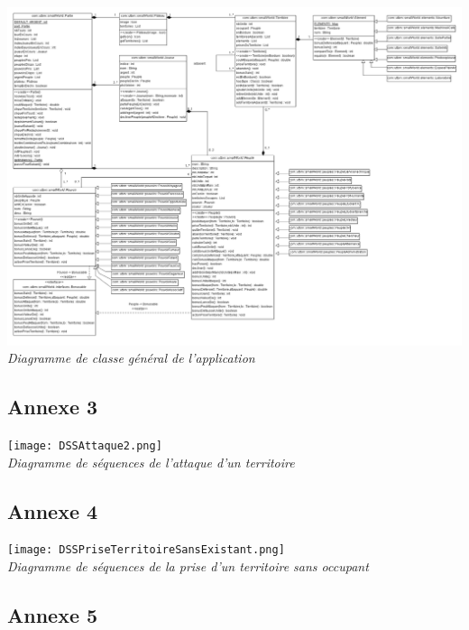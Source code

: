 \documentclass[a4paper, 11pt]{article}
\begin{document}
\begin{appendix}
		\begin{center}
			\includegraphics[width=16cm]{DiagrammeDeClasseAvecSub.png}\\
			\emph{Diagramme de classe général de l'application}		
		\end{center}
		
		\newpage
		
		\subsection*{Annexe 3}
		
		\begin{center}
			\texttt{[image: DSSAttaque2.png]}\\
			\emph{Diagramme de séquences de l'attaque d'un territoire}
		\end{center}
		
		\newpage
		
		
		\subsection*{Annexe 4}
		
		\begin{center}
			\texttt{[image: DSSPriseTerritoireSansExistant.png]}\\
			\emph{Diagramme de séquences de la prise d'un territoire sans occupant}
		\end{center}
		
		\newpage


		\subsection*{Annexe 5}
		

\end{appendix}
\end{document}
